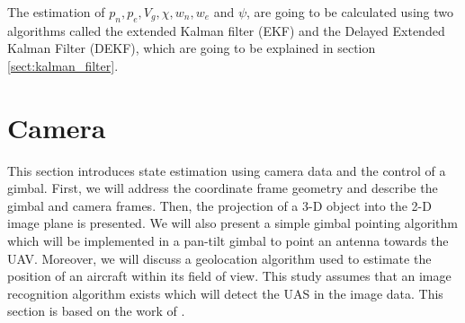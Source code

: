 The estimation of $p_n,p_e,V_g,\chi,w_n,w_e$ and $\psi$, are going to be calculated using two algorithms called the extended Kalman filter (EKF) and the 
Delayed Extended Kalman Filter (DEKF), which are going to be explained in section \ref{sect:kalman_filter}.

\pagebreak
\section{Camera}{\label{sect:camera}}
This section introduces state estimation using camera data and the control of a gimbal. First, we will address the coordinate frame geometry and describe the gimbal and camera frames. Then, the projection of a 3-D object into the 2-D image plane is presented. We will also present a simple gimbal pointing algorithm which will be implemented in a pan-tilt gimbal to point an antenna towards the UAV. Moreover, we will discuss a geolocation algorithm used to estimate the position of an aircraft within its field of view. This study assumes that an image recognition algorithm exists which will detect the UAS in the image data. This section is based on the work of \cite{Beard2010}.
